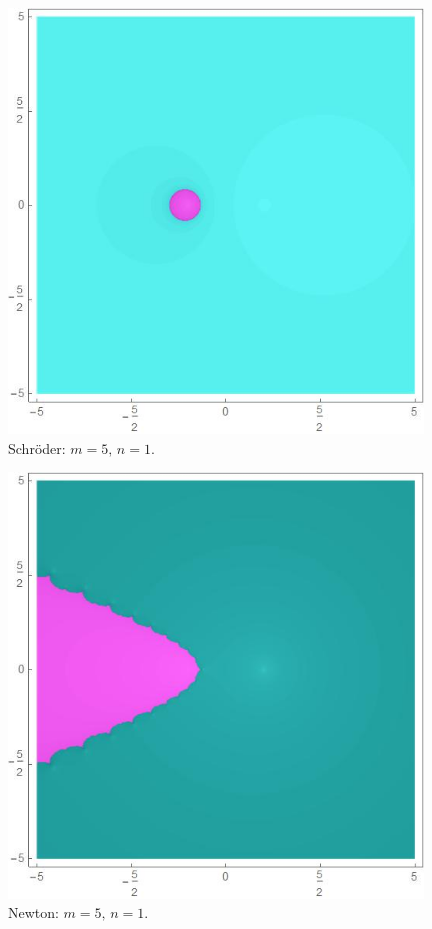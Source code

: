 \begin{figure}[H]
\vspace{0.5cm}

\begin{minipage}[t]{0.45\textwidth}
\centering
\includegraphics[width=0.98\textwidth]{fuentes/articulo-cuadraticos/imagenes/sch_m_5n_1.jpg}
\small Schröder: $m=5, \, n=1.$
\end{minipage}\hfill
\begin{minipage}[t]{0.45\textwidth}
\centering
\includegraphics[width=0.98\textwidth]{fuentes/articulo-cuadraticos/imagenes/newton_m_5n_1.jpg}
\small Newton: $m=5, \, n=1.$
\end{minipage}


\end{figure}
